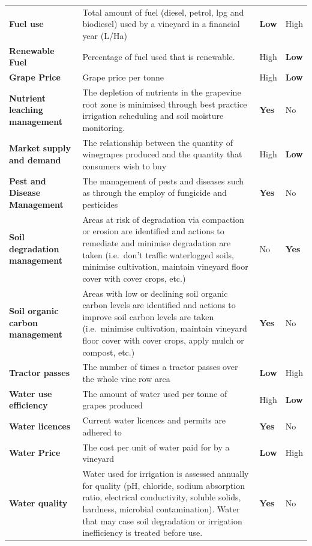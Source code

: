 \documentclass[fleqn,10pt]{wlscirep}
\begin{document}
\begin{table}[h]
\begin{tabular}{@{}llll@{}}
    \textbf{Fuel use} & Total amount of fuel (diesel, petrol, lpg and biodiesel) used by a vineyard in a financial year (L/Ha) & \textbf{Low} & High \\
    \textbf{Renewable Fuel} & Percentage of fuel used that is renewable. & High & \textbf{Low} \\
    \textbf{Grape Price} & Grape price per tonne & High & \textbf{Low} \\
    \textbf{Nutrient leaching management} & The depletion of nutrients in the grapevine root zone is minimised through best practice irrigation scheduling and soil moisture monitoring. & \textbf{Yes} & No \\
    \textbf{Market supply and demand} & The relationship between the quantity of winegrapes produced and the quantity that consumers wish to buy & High & \textbf{Low} \\
    \textbf{Pest and Disease Management} & The management of pests and diseases such as through the employ of fungicide and pesticides & \textbf{Yes} & No \\
    \textbf{Soil degradation management} & Areas at risk of degradation via compaction or erosion are identified and actions to remediate and minimise degradation are taken (i.e.~don't traffic waterlogged soils, minimise cultivation, maintain vineyard floor cover with cover crops, etc.) & No & \textbf{Yes} \\
    \textbf{Soil organic carbon management} & Areas with low or declining soil organic carbon levels are identified and actions to improve soil carbon levels are taken (i.e.~minimise cultivation, maintain vineyard floor cover with cover crops, apply mulch or compost, etc.) & \textbf{Yes} & No \\
    \textbf{Tractor passes} & The number of times a tractor passes over the whole vine row area & \textbf{Low} & High \\
    \textbf{Water use efficiency} & The amount of water used per tonne of grapes produced & High & \textbf{Low} \\
    \textbf{Water licences} & Current water licences and permits are adhered to & \textbf{Yes} & No \\
    \textbf{Water Price} & The cost per unit of water paid for by a vineyard & \textbf{Low} & High \\
    \textbf{Water quality} & Water used for irrigation is assessed annually for quality (pH, chloride, sodium absorption ratio, electrical conductivity, soluble solids, hardness, microbial contamination). Water that may case soil degradation or irrigation inefficiency is treated before use. & \textbf{Yes} & No \\

\end{tabular}
\end{table}
\end{document}
